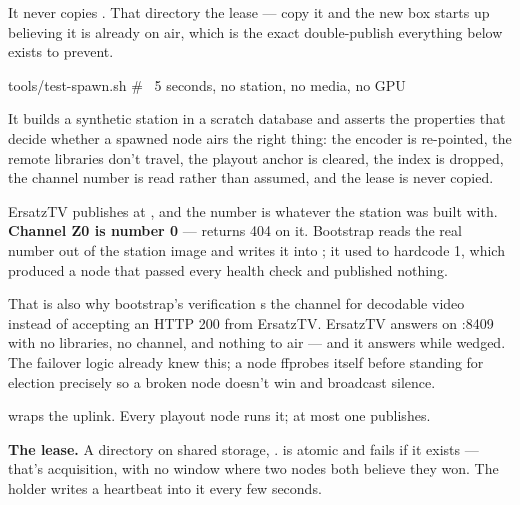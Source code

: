 \documentclass[fontpath=fonts/,logopath=logo/]{riposte-doc}
\begin{document}
It never copies . That directory  the lease — copy it and the new box starts up believing it is already on air, which is the exact double-publish everything below exists to prevent.



\ripcodeopen
{}
\begin{ripcodeblock}
tools/test-spawn.sh      # ~5 seconds, no station, no media, no GPU
\end{ripcodeblock}
\ripcodesizereset\ripcodeclose

It builds a synthetic station in a scratch database and asserts the properties that decide whether a spawned node airs the right thing: the encoder is re-pointed, the remote libraries don't travel, the playout anchor is cleared, the index is dropped, the channel number is read rather than assumed, and the lease is never copied.



ErsatzTV publishes at , and the number is whatever the station was built with. \textbf{Channel Z0 is number 0} —  returns 404 on it. Bootstrap reads the real number out of the station image and writes it into ; it used to hardcode 1, which produced a node that passed every health check and published nothing.

That is also why bootstrap's verification s the channel for decodable video instead of accepting an HTTP 200 from ErsatzTV. ErsatzTV answers on :8409 with no libraries, no channel, and nothing to air — and it answers while wedged. The failover logic already knew this; a node ffprobes itself before standing for election precisely so a broken node doesn't win and broadcast silence.



 wraps the uplink. Every playout node runs it; at most one publishes.

\textbf{The lease.} A directory on shared storage, .  is atomic and fails if it exists — that's acquisition, with no window where two nodes both believe they won. The holder writes a heartbeat into it every few seconds.
\end{document}
